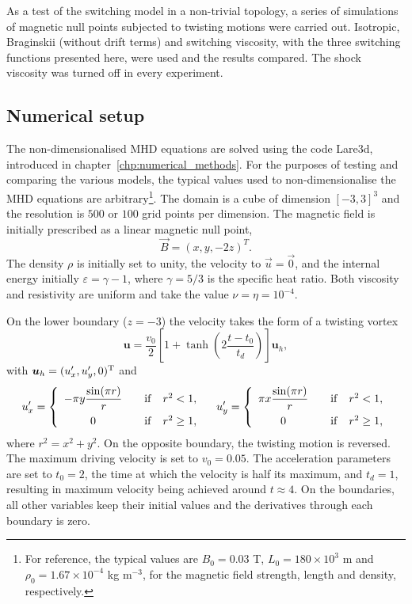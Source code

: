 \label{sec:slow_null_point}

As a test of the switching model in a non-trivial topology, a series of simulations of magnetic null points subjected to twisting motions were carried out. Isotropic, Braginskii (without drift terms) and switching viscosity, with the three switching functions presented here, were used and the results compared. The shock viscosity was turned off in every experiment.

\subsection{Numerical setup}

The non-dimensionalised MHD equations are solved using the code Lare3d, introduced in chapter~\ref{chp:numerical_methods}. For the purposes of testing and comparing the various models, the typical values used to non-dimensionalise the MHD equations are arbitrary\footnote{For reference, the typical values are $B_0 = 0.03$ T, $L_0 = 180\times10^{3}$ m and $\rho_0 = 1.67\times10^{-4}$ kg m$^{-3}$, for the magnetic field strength, length and density, respectively.}. The domain is a cube of dimension $[-3, 3]^3$ and the resolution is $500$ or $100$ grid points per dimension. The magnetic field is initially prescribed as a linear magnetic null point,
\begin{equation}
  \label{eq:null_mag_field}
\vec{B} = (x, y, -2z)^T.
\end{equation}
The density $\rho$ is initially set to unity, the velocity to $\vec{u} = \vec{0}$, and the internal energy initially $\varepsilon = \gamma-1$, where $\gamma = 5/3$ is the specific heat ratio. Both viscosity and resistivity are uniform and take the value $\nu = \eta = 10^{-4}$.

On the lower boundary ($z=-3$) the velocity takes the form of a twisting vortex
\begin{equation}\label{ramp}
\boldsymbol{u} = \frac{v_0}{2}\left[1+\tanh\left(2\frac{t-t_0}{t_d}\right)\right]\boldsymbol{u}_h,
\end{equation}
with $\boldsymbol{u}_h = (u_x',u_y',0)^{\rm T}$ and
\begin{equation}\label{vprime}
u_x' = \left\{\begin{array}{cc}
-\pi y\displaystyle\frac{\sin(\pi r)}{r} &\quad{\rm if}\quad r^2<1, \\[8pt]
\displaystyle 0 &\quad{\rm if}\quad r^2 \ge 1,
\end{array}\right. \quad
u_y' = \left\{\begin{array}{cc}
\pi x\displaystyle\frac{\sin(\pi r)}{r} &\quad{\rm if}\quad r^2<1, \\[8pt]
\displaystyle 0 &\quad{\rm if}\quad r^2 \ge 1,
\end{array}\right.
\end{equation}
where $r^2=x^2+y^2$. On the opposite boundary, the twisting motion is reversed. The maximum driving velocity is set to $v_0 = 0.05$. The acceleration parameters are set to $t_0 = 2$, the time at which the velocity is half its maximum, and $t_d = 1$, resulting in maximum velocity being achieved around $t\approx4$. On the boundaries, all other variables keep their initial values and the derivatives through each boundary is zero.

